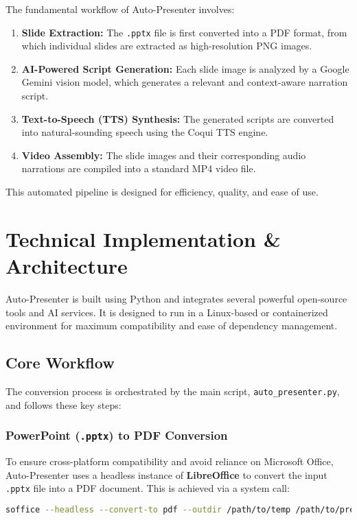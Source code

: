 \documentclass{article}
\begin{document}
The fundamental workflow of Auto-Presenter involves:
\begin{enumerate}
    \item \textbf{Slide Extraction:} The \texttt{.pptx} file is first converted into a PDF format, from which individual slides are extracted as high-resolution PNG images.
    \item \textbf{AI-Powered Script Generation:} Each slide image is analyzed by a Google Gemini vision model, which generates a relevant and context-aware narration script.
    \item \textbf{Text-to-Speech (TTS) Synthesis:} The generated scripts are converted into natural-sounding speech using the Coqui TTS engine.
    \item \textbf{Video Assembly:} The slide images and their corresponding audio narrations are compiled into a standard MP4 video file.
\end{enumerate}
This automated pipeline is designed for efficiency, quality, and ease of use.

\section{Technical Implementation \& Architecture}
Auto-Presenter is built using Python and integrates several powerful open-source tools and AI services. It is designed to run in a Linux-based or containerized environment for maximum compatibility and ease of dependency management.

\subsection{Core Workflow}
The conversion process is orchestrated by the main script, \texttt{auto\_presenter.py}, and follows these key steps:

\subsubsection{PowerPoint (\texttt{.pptx}) to PDF Conversion}
To ensure cross-platform compatibility and avoid reliance on Microsoft Office, Auto-Presenter uses a headless instance of \textbf{LibreOffice} to convert the input \texttt{.pptx} file into a PDF document. This is achieved via a system call:
\begin{lstlisting}[language=bash, caption=LibreOffice Conversion Command (Conceptual)]
soffice --headless --convert-to pdf --outdir /path/to/temp /path/to/presentation.pptx
\end{lstlisting}
\end{document}

